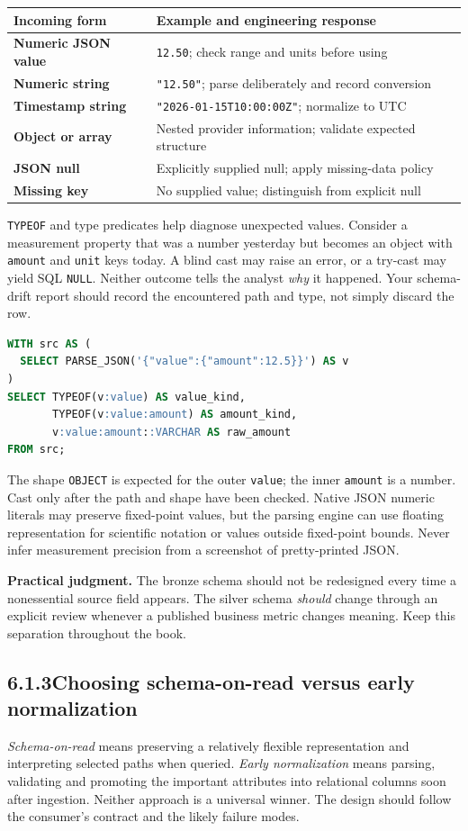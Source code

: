 \documentclass[11pt,twoside]{article}
\newcommand{\topic}[2]{\subsection*{#1\quad #2}}
\begin{document}
\begin{center}\small\begin{tabularx}{\linewidth}{@{}>{\bfseries}p{33mm}X@{}}\toprule
Incoming form & Example and engineering response\\\midrule
Numeric JSON value & \texttt{12.50}; check range and units before using\\
Numeric string & \texttt{"12.50"}; parse deliberately and record conversion\\
Timestamp string & \texttt{"2026-01-15T10:00:00Z"}; normalize to UTC\\
Object or array & Nested provider information; validate expected structure\\
JSON null & Explicitly supplied null; apply missing-data policy\\
Missing key & No supplied value; distinguish from explicit null\\\bottomrule\end{tabularx}\end{center}

\texttt{TYPEOF} and type predicates help diagnose unexpected values. Consider a measurement property that was a number yesterday but becomes an object with \texttt{amount} and \texttt{unit} keys today. A blind cast may raise an error, or a try-cast may yield SQL \texttt{NULL}. Neither outcome tells the analyst \emph{why} it happened. Your schema-drift report should record the encountered path and type, not simply discard the row.

\begin{lstlisting}[language=SQL,caption={Inspect the nested value before applying a numeric contract.}]
WITH src AS (
  SELECT PARSE_JSON('{"value":{"amount":12.5}}') AS v
)
SELECT TYPEOF(v:value) AS value_kind,
       TYPEOF(v:value:amount) AS amount_kind,
       v:value:amount::VARCHAR AS raw_amount
FROM src;
\end{lstlisting}
The shape \texttt{OBJECT} is expected for the outer \texttt{value}; the inner \texttt{amount} is a number. Cast only after the path and shape have been checked. Native JSON numeric literals may preserve fixed-point values, but the parsing engine can use floating representation for scientific notation or values outside fixed-point bounds. Never infer measurement precision from a screenshot of pretty-printed JSON.

\textbf{Practical judgment.} The bronze schema should not be redesigned every time a nonessential source field appears. The silver schema \emph{should} change through an explicit review whenever a published business metric changes meaning. Keep this separation throughout the book.
\newpage
\topic{6.1.3}{Choosing schema-on-read versus early normalization}
\emph{Schema-on-read} means preserving a relatively flexible representation and interpreting selected paths when queried. \emph{Early normalization} means parsing, validating and promoting the important attributes into relational columns soon after ingestion. Neither approach is a universal winner. The design should follow the consumer's contract and the likely failure modes.
\end{document}
